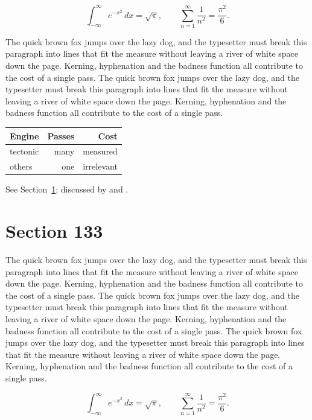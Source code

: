 \documentclass{article}
\begin{document}
\begin{equation}\label{eq:132}
\int_{-\infty}^{\infty} e^{-x^{2}}\,dx = \sqrt{\pi}, \qquad
\sum_{n=1}^{\infty} \frac{1}{n^{2}} = \frac{\pi^{2}}{6}.
\end{equation}

The quick brown fox jumps over the lazy dog, and the typesetter must break this paragraph into lines that fit the measure without leaving a river of white space down the page. Kerning, hyphenation and the badness function all contribute to the cost of a single pass. The quick brown fox jumps over the lazy dog, and the typesetter must break this paragraph into lines that fit the measure without leaving a river of white space down the page. Kerning, hyphenation and the badness function all contribute to the cost of a single pass. 

\begin{center}
\begin{tabular}{lrr}
\toprule
Engine & Passes & Cost \\
\midrule
tectonic & many & measured \\
others & one & irrelevant \\
\bottomrule
\end{tabular}
\end{center}

See Section~\ref{sec:133}; discussed by \textcite{k3} and \textcite{l5}.
\section{Section 133}
\label{sec:133}
The quick brown fox jumps over the lazy dog, and the typesetter must break this paragraph into lines that fit the measure without leaving a river of white space down the page. Kerning, hyphenation and the badness function all contribute to the cost of a single pass. The quick brown fox jumps over the lazy dog, and the typesetter must break this paragraph into lines that fit the measure without leaving a river of white space down the page. Kerning, hyphenation and the badness function all contribute to the cost of a single pass. The quick brown fox jumps over the lazy dog, and the typesetter must break this paragraph into lines that fit the measure without leaving a river of white space down the page. Kerning, hyphenation and the badness function all contribute to the cost of a single pass. 

\begin{equation}\label{eq:133}
\int_{-\infty}^{\infty} e^{-x^{2}}\,dx = \sqrt{\pi}, \qquad
\sum_{n=1}^{\infty} \frac{1}{n^{2}} = \frac{\pi^{2}}{6}.
\end{equation}
\end{document}
